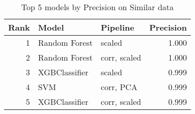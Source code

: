 \begin{table}[!htb]
\caption{Top 5 models by Precision on Similar data}
\label{table-top-5-precision-similar}
\centering
\begin{tabular}{rllr}
\toprule
Rank & Model & Pipeline & Precision \\
\midrule
1 & Random Forest & scaled & 1.000 \\
2 & Random Forest & corr, scaled & 1.000 \\
3 & XGBClassifier & scaled & 0.999 \\
4 & SVM & corr, PCA & 0.999 \\
5 & XGBClassifier & corr, scaled & 0.999 \\
\bottomrule
\end{tabular}
\end{table}
